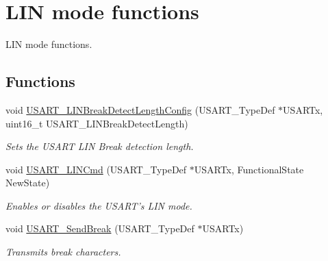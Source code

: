 \hypertarget{group___u_s_a_r_t___group4}{\section{L\-I\-N mode functions}
\label{group___u_s_a_r_t___group4}
}


L\-I\-N mode functions.  


\subsection*{Functions}
\begin{DoxyCompactItemize}
\item 
void \hyperlink{group___u_s_a_r_t___group4_ga7bc2d291831cbc5e53e73337308029b5}{U\-S\-A\-R\-T\-\_\-\-L\-I\-N\-Break\-Detect\-Length\-Config} (U\-S\-A\-R\-T\-\_\-\-Type\-Def $\ast$U\-S\-A\-R\-Tx, uint16\-\_\-t U\-S\-A\-R\-T\-\_\-\-L\-I\-N\-Break\-Detect\-Length)
\begin{DoxyCompactList}\small\item\em Sets the U\-S\-A\-R\-T L\-I\-N Break detection length. \end{DoxyCompactList}\item 
void \hyperlink{group___u_s_a_r_t___group4_ga9fdd6296f4ca4acdfcbd58bf56bd4185}{U\-S\-A\-R\-T\-\_\-\-L\-I\-N\-Cmd} (U\-S\-A\-R\-T\-\_\-\-Type\-Def $\ast$U\-S\-A\-R\-Tx, Functional\-State New\-State)
\begin{DoxyCompactList}\small\item\em Enables or disables the U\-S\-A\-R\-T's L\-I\-N mode. \end{DoxyCompactList}\item 
void \hyperlink{group___u_s_a_r_t___group4_ga39a3d33e23ee28529fa8f7259ce6811e}{U\-S\-A\-R\-T\-\_\-\-Send\-Break} (U\-S\-A\-R\-T\-\_\-\-Type\-Def $\ast$U\-S\-A\-R\-Tx)
\begin{DoxyCompactList}\small\item\em Transmits break characters. \end{DoxyCompactList}\end{DoxyCompactItemize}


